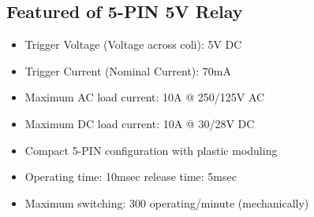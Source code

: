 \documentclass[a4paper]{report}
\begin{document}
    \subsection{Featured of 5-PIN 5V Relay}
        \begin{itemize}
            \item Trigger Voltage (Voltage across coli): 5V DC
            \item Trigger Current (Nominal Current): 70mA
            \item Maximum AC load current: 10A @ 250/125V AC
            \item Maximum DC load current: 10A @ 30/28V DC
            \item Compact 5-PIN configuration with plastic moduling
            \item Operating time: 10msec release time: 5msec
            \item Maximum switching: 300 operating/minute (mechanically)
        \end{itemize}
\end{document}
